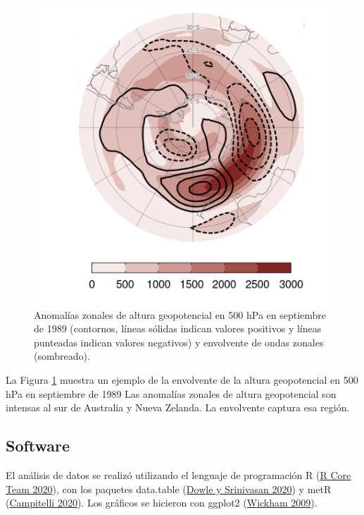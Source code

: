 \documentclass[12pt,oneside,a4paper]{reedthesis}
\begin{document}
\begin{figure}

{\centering \includegraphics{figures/15-onda3/envolvente-ejemplo-1} 

}

\caption{Anomalías zonales de altura geopotencial en 500 hPa en septiembre de 1989 (contornos, líneas sólidas indican valores positivos y líneas punteadas indican valores negativos) y envolvente de ondas zonales (sombreado).}\label{fig:envolvente-ejemplo}
\end{figure}



La Figura \ref{fig:envolvente-ejemplo} muestra un ejemplo de la envolvente de la altura geopotencial en 500 hPa en septiembre de 1989
Las anomalías zonales de altura geopotencial son intensas al sur de Australia y Nueva Zelanda.
La envolvente captura esa región.

\hypertarget{software}{%
\subsection{Software}\label{software}}

El análisis de datos se realizó utilizando el lenguaje de programación R (\protect\hyperlink{ref-rcoreteam2020}{R Core Team 2020}), con los paquetes data.table (\protect\hyperlink{ref-dowle2020}{Dowle y Srinivasan 2020}) y metR (\protect\hyperlink{ref-campitelli2020}{Campitelli 2020}).
Los gráficos se hicieron con ggplot2 (\protect\hyperlink{ref-wickham2009}{Wickham 2009}).
\end{document}
